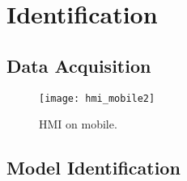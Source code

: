 
\chapter{Identification}
\label{cha:ident}

\section{Data Acquisition}

\begin{figure}[H]
  \centering
 \texttt{[image: hmi\_mobile2]}
  \caption{HMI on mobile.}
  \label{fig:hmi_mobile}
\end{figure}
\section{Model Identification}





